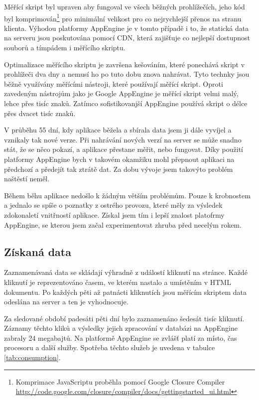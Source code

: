 \documentclass[bc,male,java,dept456]{diploma}						%
\begin{document}
Měřící skript byl upraven aby fungoval ve všech běžných prohlížečích, jeho kód byl komprimován\footnote{Komprimace JavaScriptu proběhla pomocí Google Closure Compiler \url{http://code.google.com/closure/compiler/docs/gettingstarted_ui.html}} pro minimální velikost pro co nejrychlejší přenos na stranu klienta. Výhodou platformy AppEngine je v tomto případě i to, že statická data na serveru jsou poskutována pomocí CDN\cite{cdn}, která zajišťuje co nejlepší dostupnost souborů a tímpádem i měřícího skriptu.

Optimalizace měřícího skriptu je završena kešováním, které ponechává skript v pro\-hlí\-že\-či dva dny a nemusí ho po tuto dobu znova nahrávat. Tyto technky jsou běžně využívány měřícími nástroji, které používají měřící skript. Oproti zavedeným nástrojům jako je Google AppEngine je měřící skript velmi malý, lehce přes tisíc znaků. Zatímco sofistikovanjší AppEngine používá skript o délce přes dvacet tisíc znaků.

V průběhu 55 dní, kdy aplikace běžela a sbírala data jsem ji dále vyvíjel a vznikaly tak nové verze. Při nahrávání nových verzí na server se může snadno stát, že se něco pokazí, a aplikace přestane měřit, nebo fungovat. Díky použití platformy AppEngine bych v  takovém okamžiku mohl přepnout aplikaci na předchozí a předejít tak ztrátě dat. Za dobu vývoje jsem takovýto problém naštěstí neměl.

Během běhu aplikace nedošlo k žádným větším problémům. Pouze k krobnostem a jednalo se spíše o poznatky z ostrého provozu, které měly za výsledek zdokonaletí vnitřností aplikace. Získal jsem tím i lepší znalost platofrmy AppEngine, se kterou jsem začal experimentovat zhruba před necelým rokem.


\subsection{Získaná data}

Zaznamenávaná data se skládají výhradně z událostí kliknutí na stránce. Každé kli\-knu\-tí je reprezentováno časem, ve kterém nastalo a umístěním v HTML dokumentu. Po ka\-ždých pěti až patnácti kliknutích jsou měřícím skriptem data odeslána na server a ten je vyhodnocuje.

Za sledované období padesáti pěti dní bylo zaznamenáno šedesát tisíc kliknutí. Zá\-zna\-my těchto kliků a výsledky jejich zpracování v databázi na AppEngine zabraly 24 megabajtů. Na platformě AppEngine se zvlášť platí\cite{billing} za místo, čas procesoru a další služby. Spotřeba těchto služeb je uvedena v tabulce \ref{tab:consumption}.
\end{document}
